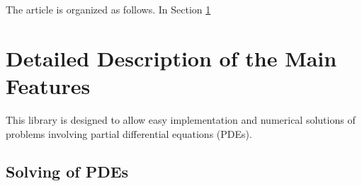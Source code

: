 \documentclass[prodmode,acmtoms]{acmsmall}
\numberwithin{equation}{section}
\newcommand{\todo}[1]{\textbf{\textsc{\textcolor{black}{TODO: #1}}}}
\begin{document}
The article is organized as follows. In Section
\ref{detailed_description} 
 
%
%
%



\section{Detailed Description of the Main Features}
\label{detailed_description}
This library is designed to allow easy implementation and numerical solutions 
of problems involving partial differential equations (PDEs). 
\subsection{Solving of PDEs}
\end{document}
